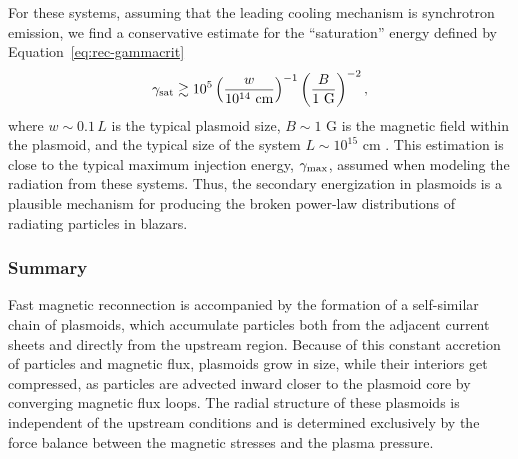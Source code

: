
For these systems, assuming that the leading cooling mechanism is synchrotron emission, we find a conservative estimate for the ``saturation'' energy defined by Equation~\eqref{eq:rec-gammacrit}
\begin{equation}
    \gamma_{\rm sat}\gtrsim 
        10^5 \left(\frac{w}{10^{14}~\text{cm}}\right)^{-1}
                \left(\frac{B}{1~\text{G}}\right)^{-2},
\end{equation}
where  $w\sim 0.1\, L$ is the typical plasmoid size, $B\sim 1$ G is the magnetic field within the plasmoid, and the typical size of the system $L\sim 10^{15}$ cm \citep[see, e.g.,][]{2008MNRAS.385..283C}. This estimation is close to the typical maximum injection energy, $\gamma_{\rm max}$, assumed when modeling the radiation from these systems. Thus, the secondary energization in plasmoids is a plausible mechanism for producing the broken power-law distributions of radiating particles in blazars.




\subsubsection*{Summary}
Fast magnetic reconnection is accompanied by the formation of a self-similar chain of plasmoids, which accumulate particles both from the adjacent current sheets and directly from the upstream region. Because of this constant accretion of particles and magnetic flux, plasmoids grow in size, while their interiors get compressed, as particles are advected inward closer to the plasmoid core by converging magnetic flux loops. The radial structure of these plasmoids is independent of the upstream conditions and is determined exclusively by the force balance between the magnetic stresses and the plasma pressure.

